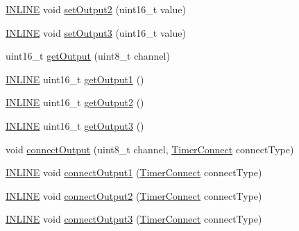 \begin{DoxyCompactItemize}
\item 
\hyperlink{io_8h_a2eb6f9e0395b47b8d5e3eeae4fe0c116}{I\-N\-L\-I\-N\-E} void \hyperlink{classflame_1_1_timer_implementation_a71850b7feccf996506f0e973f68fa1cf}{set\-Output2} (uint16\-\_\-t value)
\item 
\hyperlink{io_8h_a2eb6f9e0395b47b8d5e3eeae4fe0c116}{I\-N\-L\-I\-N\-E} void \hyperlink{classflame_1_1_timer_implementation_a487897e17825a7197396eaf212ce3d1b}{set\-Output3} (uint16\-\_\-t value)
\item 
uint16\-\_\-t \hyperlink{classflame_1_1_timer_implementation_a772d1ec8806c9c2c479b55539d827076}{get\-Output} (uint8\-\_\-t channel)
\item 
\hyperlink{io_8h_a2eb6f9e0395b47b8d5e3eeae4fe0c116}{I\-N\-L\-I\-N\-E} uint16\-\_\-t \hyperlink{classflame_1_1_timer_implementation_adbed484d9369a198238f138e29ed63d3}{get\-Output1} ()
\item 
\hyperlink{io_8h_a2eb6f9e0395b47b8d5e3eeae4fe0c116}{I\-N\-L\-I\-N\-E} uint16\-\_\-t \hyperlink{classflame_1_1_timer_implementation_ae4108f7c84663eaf80e6958bafefd01f}{get\-Output2} ()
\item 
\hyperlink{io_8h_a2eb6f9e0395b47b8d5e3eeae4fe0c116}{I\-N\-L\-I\-N\-E} uint16\-\_\-t \hyperlink{classflame_1_1_timer_implementation_aa17aee927a9999422c190420da78dd1d}{get\-Output3} ()
\item 
void \hyperlink{classflame_1_1_timer_implementation_a53ba3822a5d824fc8d35d835ab18afa7}{connect\-Output} (uint8\-\_\-t channel, \hyperlink{namespaceflame_ae65577f52d5a5d4ce0cc5a4b85fb9ba9}{Timer\-Connect} connect\-Type)
\item 
\hyperlink{io_8h_a2eb6f9e0395b47b8d5e3eeae4fe0c116}{I\-N\-L\-I\-N\-E} void \hyperlink{classflame_1_1_timer_implementation_a5a8d88bff958036d3bf55c29c540b3b8}{connect\-Output1} (\hyperlink{namespaceflame_ae65577f52d5a5d4ce0cc5a4b85fb9ba9}{Timer\-Connect} connect\-Type)
\item 
\hyperlink{io_8h_a2eb6f9e0395b47b8d5e3eeae4fe0c116}{I\-N\-L\-I\-N\-E} void \hyperlink{classflame_1_1_timer_implementation_ac56dc9af8ff923e6d331f69d35375941}{connect\-Output2} (\hyperlink{namespaceflame_ae65577f52d5a5d4ce0cc5a4b85fb9ba9}{Timer\-Connect} connect\-Type)
\item 
\hyperlink{io_8h_a2eb6f9e0395b47b8d5e3eeae4fe0c116}{I\-N\-L\-I\-N\-E} void \hyperlink{classflame_1_1_timer_implementation_af0e2e07199ea95d45a0220f64b11b803}{connect\-Output3} (\hyperlink{namespaceflame_ae65577f52d5a5d4ce0cc5a4b85fb9ba9}{Timer\-Connect} connect\-Type)
\item 

\end{DoxyCompactItemize}
